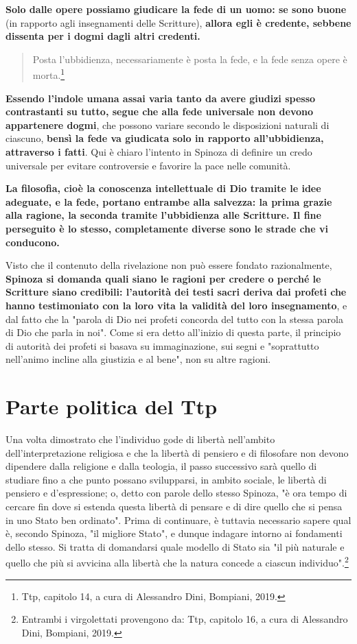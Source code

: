\textbf{Solo dalle opere possiamo giudicare la fede di un uomo: se sono buone} (in rapporto agli insegnamenti delle Scritture), \textbf{allora egli è credente, sebbene dissenta per i dogmi dagli altri credenti.}

\begin{quotation}
	\small Posta l'ubbidienza, necessariamente è posta la fede, e la fede senza opere è morta.\footnote{Ttp, capitolo 14, a cura di Alessandro Dini, Bompiani, 2019.}
\end{quotation}

\textbf{Essendo l'indole umana assai varia tanto da avere giudizi spesso contrastanti su tutto, segue che alla fede universale non devono appartenere dogmi}, che possono variare secondo le disposizioni naturali di ciascuno, \textbf{bensì la fede va giudicata solo in rapporto all'ubbidienza, attraverso i fatti}. Qui è chiaro l'intento in Spinoza di definire un credo universale per evitare controversie e favorire la pace nelle comunità.

\textbf{La filosofia, cioè la conoscenza intellettuale di Dio tramite le idee adeguate, e la fede, portano entrambe alla salvezza: la prima grazie alla ragione, la seconda tramite l'ubbidienza alle Scritture. Il fine perseguito è lo stesso, completamente diverse sono le strade che vi conducono.}

Visto che il contenuto della rivelazione non può essere fondato razionalmente, \textbf{Spinoza si domanda quali siano le ragioni per credere  o perché le Scritture siano credibili: l'autorità dei testi sacri deriva dai profeti che hanno testimoniato con la loro vita la validità del loro insegnamento}, e dal fatto che la "parola di Dio nei profeti concorda del tutto con la stessa parola di Dio che parla in noi".
Come si era detto all'inizio di questa parte, il principio di autorità dei profeti si basava su immaginazione, sui segni e "soprattutto nell'animo incline alla giustizia e al bene", non su altre ragioni.

\section[Parte politica]{Parte politica del Ttp}

Una volta dimostrato che l’individuo gode di libertà nell’ambito dell’interpretazione religiosa e che la libertà di pensiero e 
di filosofare non devono dipendere dalla religione e dalla teologia, il passo successivo sarà quello di studiare fino a che punto possano svilupparsi, in ambito
sociale, le libertà di pensiero e d’espressione; o, detto con parole dello stesso
Spinoza, "è ora tempo di cercare fin dove si estenda questa libertà di pensare
e di dire quello che si pensa in uno Stato ben ordinato". Prima di continuare, è tuttavia necessario sapere qual è, secondo Spinoza, "il migliore Stato", e
dunque indagare intorno ai fondamenti dello stesso. Si tratta di domandarsi
quale modello di Stato sia "il più naturale e quello che più si avvicina alla libertà che la natura concede a ciascun individuo".\footnote{Entrambi i virgolettati provengono da: Ttp, capitolo 16, a cura di Alessandro Dini, Bompiani, 2019.}

